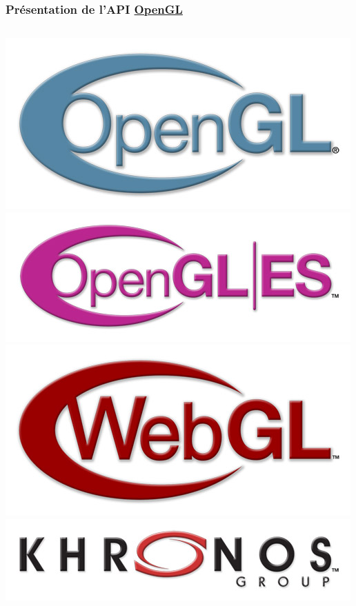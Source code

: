 \begin{frame}
  \frametitle{Présentation de l'API \href{http://www.opengl.org}{OpenGL}}
  \begin{columns}
    \begin{column}{.2\textwidth}
      \begin{center}
        \includegraphics[width=1.\textwidth]{images/khronos-logos/OpenGL/OpenGL_500.jpg} \\
        \includegraphics[width=1.\textwidth]{images/khronos-logos/OpenGL_ES/OpenGL-ES_500.jpg} \\
        \includegraphics[width=1.\textwidth]{images/khronos-logos/WebGL/WebGL_500.jpg} \\
        \includegraphics[width=1.\textwidth]{images/khronos-logos/Khronos_Group/Khronos_Group_500.jpg}

\end{center}
\end{column}
\end{columns}
\end{frame}
